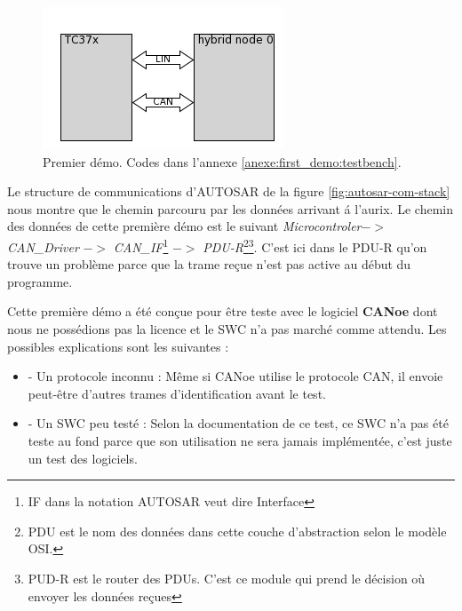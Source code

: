 \begin{figure}[!htb] 
\centering 
\includegraphics[]{img/first_demo_testbench.png} 
\caption{Premier démo. Codes dans l'annexe \ref{anexe:first_demo:testbench}.} 
\label{fig:first-demo-diagram} 
\end{figure} 

Le structure de communications d'AUTOSAR de la figure \ref{fig:autosar-com-stack} nous montre que le chemin parcouru par les données arrivant \'a l'aurix. Le chemin des données de cette première démo est le suivant \textit{Microcontroler}$ ->$ \textit{CAN\_Driver}\cite{can_drv_man} $->$ \textit{CAN\_IF}\footnote{IF dans la notation AUTOSAR veut dire Interface}\cite{can_if_man} $->$ \textit{PDU-R}\footnote{PDU est le nom des donn\'ees dans cette couche d'abstraction selon le modèle OSI\cite{osi-model}.}\footnote{PUD-R\cite{pdu_r_man} est le router des PDUs. C'est ce module qui prend le décision o\`u envoyer les données reçues}\cite{pdu_r_man}. C'est ici dans le PDU-R qu'on trouve un problème parce que la trame reçue n'est pas active au début du programme. 

Cette première démo a été conçue pour être teste avec le logiciel \textbf{CANoe}\cite{canoe} dont nous ne possédions pas la licence et le SWC n'a pas marché comme attendu. Les possibles explications sont les suivantes : 

\begin{itemize} 
    \item - Un protocole inconnu : Même si CANoe utilise le protocole CAN, il envoie peut-être d'autres trames d'identification avant le test. 
    \item - Un SWC peu test\'e : Selon la documentation de ce test, ce SWC n'a pas \'et\'e teste au fond parce que son utilisation ne sera jamais implémentée, c'est juste un test des logiciels. 

\end{itemize} 


